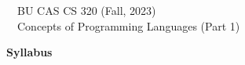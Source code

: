 \documentclass[11pt]{article}
\begin{document}
\begin{flushright}
\begin{minipage}{430pt}
{
\begin{flushleft}
{~~\large\sc BU CAS CS 320 (Fall, 2023)} \\
{~~\LARGE\sc Concepts of Programming Languages (Part 1)}
\end{flushleft}
}
\end{minipage}
\end{flushright}

\vspace{12pt}
\begin{center}
\begin{minipage}{16cm}
\begin{center}
{\LARGE\bf Syllabus} \\[12pt]
\end{center}
\end{minipage}
\end{center}

\thispagestyle{empty}
\end{document}
